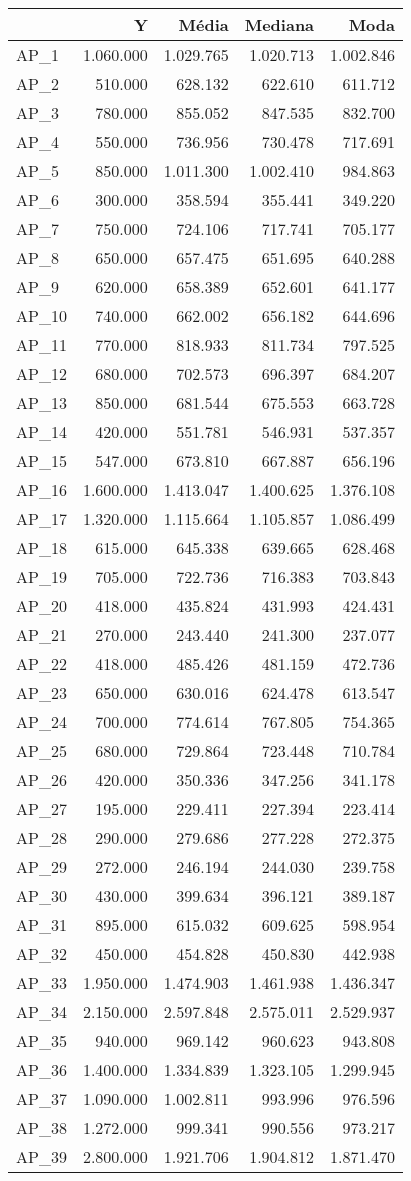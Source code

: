 \documentclass[a4paper]{article}
\begin{document}
\begin{longtable}[]{@{}lrrrr@{}}
\toprule
& Y & Média & Mediana & Moda\tabularnewline
\midrule
\endhead
AP\_1 & 1.060.000 & 1.029.765 & 1.020.713 & 1.002.846\tabularnewline
AP\_2 & 510.000 & 628.132 & 622.610 & 611.712\tabularnewline
AP\_3 & 780.000 & 855.052 & 847.535 & 832.700\tabularnewline
AP\_4 & 550.000 & 736.956 & 730.478 & 717.691\tabularnewline
AP\_5 & 850.000 & 1.011.300 & 1.002.410 & 984.863\tabularnewline
AP\_6 & 300.000 & 358.594 & 355.441 & 349.220\tabularnewline
AP\_7 & 750.000 & 724.106 & 717.741 & 705.177\tabularnewline
AP\_8 & 650.000 & 657.475 & 651.695 & 640.288\tabularnewline
AP\_9 & 620.000 & 658.389 & 652.601 & 641.177\tabularnewline
AP\_10 & 740.000 & 662.002 & 656.182 & 644.696\tabularnewline
AP\_11 & 770.000 & 818.933 & 811.734 & 797.525\tabularnewline
AP\_12 & 680.000 & 702.573 & 696.397 & 684.207\tabularnewline
AP\_13 & 850.000 & 681.544 & 675.553 & 663.728\tabularnewline
AP\_14 & 420.000 & 551.781 & 546.931 & 537.357\tabularnewline
AP\_15 & 547.000 & 673.810 & 667.887 & 656.196\tabularnewline
AP\_16 & 1.600.000 & 1.413.047 & 1.400.625 & 1.376.108\tabularnewline
AP\_17 & 1.320.000 & 1.115.664 & 1.105.857 & 1.086.499\tabularnewline
AP\_18 & 615.000 & 645.338 & 639.665 & 628.468\tabularnewline
AP\_19 & 705.000 & 722.736 & 716.383 & 703.843\tabularnewline
AP\_20 & 418.000 & 435.824 & 431.993 & 424.431\tabularnewline
AP\_21 & 270.000 & 243.440 & 241.300 & 237.077\tabularnewline
AP\_22 & 418.000 & 485.426 & 481.159 & 472.736\tabularnewline
AP\_23 & 650.000 & 630.016 & 624.478 & 613.547\tabularnewline
AP\_24 & 700.000 & 774.614 & 767.805 & 754.365\tabularnewline
AP\_25 & 680.000 & 729.864 & 723.448 & 710.784\tabularnewline
AP\_26 & 420.000 & 350.336 & 347.256 & 341.178\tabularnewline
AP\_27 & 195.000 & 229.411 & 227.394 & 223.414\tabularnewline
AP\_28 & 290.000 & 279.686 & 277.228 & 272.375\tabularnewline
AP\_29 & 272.000 & 246.194 & 244.030 & 239.758\tabularnewline
AP\_30 & 430.000 & 399.634 & 396.121 & 389.187\tabularnewline
AP\_31 & 895.000 & 615.032 & 609.625 & 598.954\tabularnewline
AP\_32 & 450.000 & 454.828 & 450.830 & 442.938\tabularnewline
AP\_33 & 1.950.000 & 1.474.903 & 1.461.938 & 1.436.347\tabularnewline
AP\_34 & 2.150.000 & 2.597.848 & 2.575.011 & 2.529.937\tabularnewline
AP\_35 & 940.000 & 969.142 & 960.623 & 943.808\tabularnewline
AP\_36 & 1.400.000 & 1.334.839 & 1.323.105 & 1.299.945\tabularnewline
AP\_37 & 1.090.000 & 1.002.811 & 993.996 & 976.596\tabularnewline
AP\_38 & 1.272.000 & 999.341 & 990.556 & 973.217\tabularnewline
AP\_39 & 2.800.000 & 1.921.706 & 1.904.812 & 1.871.470\tabularnewline

\end{longtable}
\end{document}
